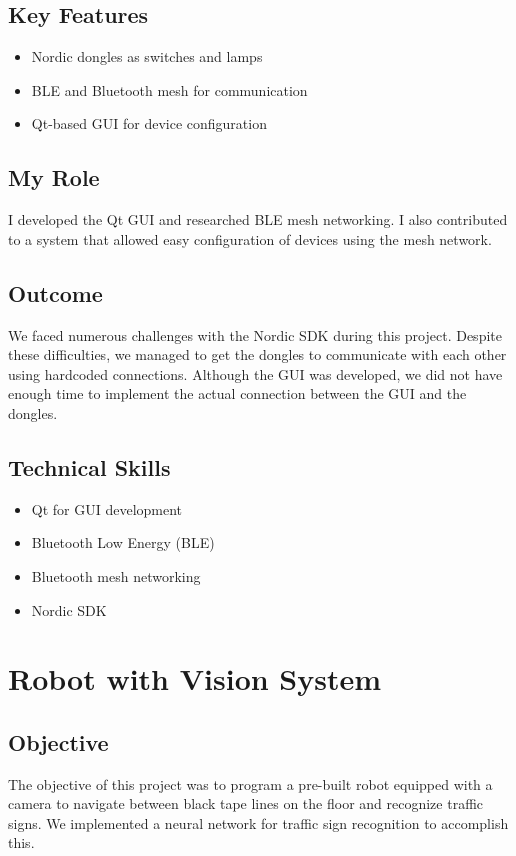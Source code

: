 \documentclass{article}
\begin{document}
\subsection{Key Features}
\begin{itemize}
    \item Nordic dongles as switches and lamps
    \item BLE and Bluetooth mesh for communication
    \item Qt-based GUI for device configuration
\end{itemize}

\subsection{My Role}
I developed the Qt GUI and researched BLE mesh networking. I also contributed to a system that allowed easy configuration of devices using the mesh network.

\subsection{Outcome}
We faced numerous challenges with the Nordic SDK during this project. Despite these difficulties, we managed to get the dongles to communicate with each other using hardcoded connections. Although the GUI was developed, we did not have enough time to implement the actual connection between the GUI and the dongles.

\subsection{Technical Skills}
\begin{itemize}
    \item Qt for GUI development
    \item Bluetooth Low Energy (BLE)
    \item Bluetooth mesh networking
    \item Nordic SDK
\end{itemize}

\section{Robot with Vision System}
\subsection{Objective}
The objective of this project was to program a pre-built robot equipped with a camera to navigate between black tape lines on the floor and recognize traffic signs. We implemented a neural network for traffic sign recognition to accomplish this.
\end{document}
